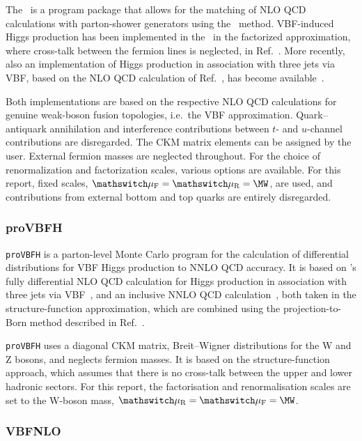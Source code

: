 The \POWHEGBOX\ is a program package that allows for the matching of
NLO QCD calculations with parton-shower generators using the \POWHEG\
method. VBF-induced Higgs production has been implemented in the
\POWHEGBOX\ in the factorized approximation, where cross-talk between
the fermion lines is neglected, in Ref.~\cite{Nason:2009ai}.  More
recently, also an implementation of Higgs production in association
with three jets via VBF, based on the NLO QCD calculation of
Ref.~\cite{Figy:2007kv}, has become available~\cite{Jager:2014vna}.

Both implementations are based on the respective NLO QCD calculations for genuine weak-boson fusion topologies, i.e.\ the VBF approximation. 
Quark--antiquark annihilation and interference contributions between $t$- and $u$-channel contributions are disregarded. 
The CKM matrix elements can be assigned by the user. External fermion masses are neglected throughout. 
For the choice of renormalization and factorization scales, various options are available. 
For this report, fixed scales, $\muF=\muR=\MW$, are used, and contributions from external bottom and top quarks are entirely disregarded.  

\subsubsection{proVBFH}
{\tt proVBFH} is a parton-level Monte Carlo program for the
calculation of differential distributions for VBF Higgs production to
NNLO QCD accuracy.
%
It is based on \POWHEG's fully differential NLO QCD calculation for
Higgs production in association with three jets via
VBF~\cite{Figy:2007kv,Jager:2014vna}, and an inclusive NNLO QCD
calculation~\cite{Bolzoni:2010xr}, both taken in the
structure-function approximation, which are combined using the
projection-to-Born method described in Ref.~\cite{Cacciari:2015jma}.

{\tt proVBFH} uses a diagonal CKM matrix, Breit--Wigner distributions
for the W and Z bosons, and neglects fermion masses.
%
It is based on the structure-function approach, which assumes that
there is no cross-talk between the upper and lower hadronic sectors.
%
For this report, the factorisation and renormalisation scales are set
to the W-boson mass, $\muR = \muF = \MW$.

\subsubsection{VBFNLO}
\label{sec:VBFNLO-sub-sub}

